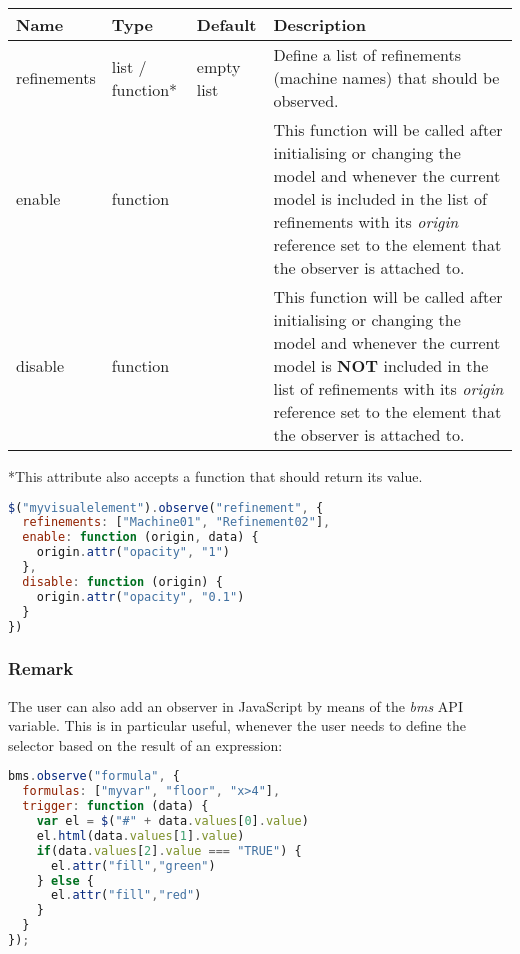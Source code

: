 \begin{tabular}{ l l l p{7cm} }
  \textbf{Name} & \textbf{Type} & \textbf{Default} & \textbf{Description} \\
  \hline\noalign{\medskip}
  refinements & list / function* & empty list & Define a list of refinements (machine names) that should be observed.\\
  \hline\noalign{\medskip}
  enable & function &  & This function will be called after initialising or changing the model and whenever the current model is included in the list of refinements with its \textit{origin} reference set to the element that the observer is attached to.\\
  \hline\noalign{\medskip}
  disable & function &  & This function will be called after initialising or changing the model and whenever the current model is \textbf{NOT} included in the list of refinements with its \textit{origin} reference set to the element that the observer is attached to.\\
\end{tabular}

*This attribute also accepts a function that should return its value.

\begin{lstlisting}[float=ht!,language=JavaScript]
$("myvisualelement").observe("refinement", {
  refinements: ["Machine01", "Refinement02"],
  enable: function (origin, data) {
    origin.attr("opacity", "1")
  },
  disable: function (origin) {
    origin.attr("opacity", "0.1")
  }
})
\end{lstlisting}

\subsubsection{Remark}

The user can also add an observer in JavaScript by means of the \textit{bms} API variable. 
This is in particular useful, whenever the user needs to define the selector based on the result of an expression:

\begin{lstlisting}[float=ht!,language=JavaScript]
bms.observe("formula", {
  formulas: ["myvar", "floor", "x>4"],
  trigger: function (data) {
    var el = $("#" + data.values[0].value)
    el.html(data.values[1].value)
    if(data.values[2].value === "TRUE") {
      el.attr("fill","green")
    } else {
      el.attr("fill","red")
    }
  }
});
\end{lstlisting}

